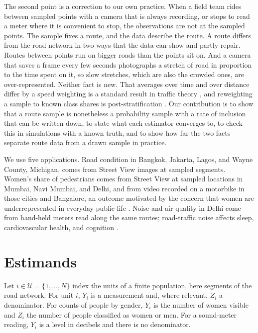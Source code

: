 \documentclass[11pt]{article}
\newcommand{\Npop}{N}
\newcommand{\universe}{\mathcal{U}}
\begin{document}
The second point is a correction to our own practice. When a field team rides between sampled points with a camera that is always recording, or stops to read a meter where it is convenient to stop, the observations are not at the sampled points. The sample fixes a route, and the data describe the route. A route differs from the road network in two ways that the data can show and partly repair. Routes between points run on bigger roads than the points sit on. And a camera that saves a frame every few seconds photographs a stretch of road in proportion to the time spent on it, so slow stretches, which are also the crowded ones, are over-represented. Neither fact is new. That averages over time and over distance differ by a speed weighting is a standard result in traffic theory \citep{wardrop1952traffic}, and reweighting a sample to known class shares is post-stratification \citep{holt1979poststratification}. Our contribution is to show that a route sample is nonetheless a probability sample with a rate of inclusion that can be written down, to state what each estimator converges to, to check this in simulations with a known truth, and to show how far the two facts separate route data from a drawn sample in practice.

We use five applications. Road condition in Bangkok, Jakarta, Lagos, and Wayne County, Michigan, comes from Street View images at sampled segments. Women's share of pedestrians comes from Street View at sampled locations in Mumbai, Navi Mumbai, and Delhi, and from video recorded on a motorbike in those cities and Bangalore, an outcome motivated by the concern that women are underrepresented in everyday public life \citep{sen1990missing,phadke2011whyloiter}. Noise and air quality in Delhi come from hand-held meters read along the same routes; road-traffic noise affects sleep, cardiovascular health, and cognition \citep{whoGuidelines2018,whoCompendium2022}.

\section{Estimands}

Let $i \in \universe = \{1, \ldots, \Npop\}$ index the units of a finite population, here segments of the road network. For unit $i$, $Y_i$ is a measurement and, where relevant, $Z_i$ a denominator. For counts of people by gender, $Y_i$ is the number of women visible and $Z_i$ the number of people classified as women or men. For a sound-meter reading, $Y_i$ is a level in decibels and there is no denominator.
\end{document}
